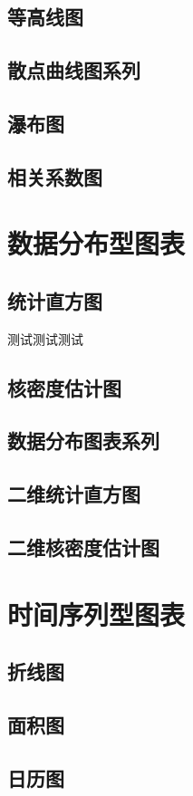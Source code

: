 \documentclass[openany]{progbookcn}
\begin{document}
\subsection{等高线图}
\subsection{散点曲线图系列}
\subsection{瀑布图}
\subsection{相关系数图}

\section{数据分布型图表}
\subsection{统计直方图}
测试测试测试
\subsection{核密度估计图}
\subsection{数据分布图表系列}
\subsection{二维统计直方图}
\subsection{二维核密度估计图}

\section{时间序列型图表}
\subsection{折线图}
\subsection{面积图}
\subsection{日历图}
\end{document}
